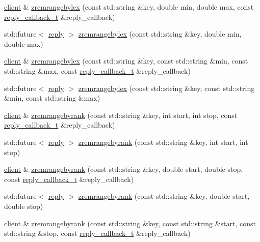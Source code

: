 \begin{DoxyCompactItemize}
\hyperlink{classcpp__redis_1_1client}{client} \& \hyperlink{classcpp__redis_1_1client_ae03899c0520352eb6a800b9d6c12f2ae}{zremrangebylex} (const std\+::string \&key, double min, double max, const \hyperlink{classcpp__redis_1_1client_a061a1140d36d2eaeda82b09a0bb3f9f2}{reply\+\_\+callback\+\_\+t} \&reply\+\_\+callback)
\item 
std\+::future$<$ \hyperlink{classcpp__redis_1_1reply}{reply} $>$ \hyperlink{classcpp__redis_1_1client_a6ed8333a10d5c4390f3e52f91c436264}{zremrangebylex} (const std\+::string \&key, double min, double max)
\item 
\hyperlink{classcpp__redis_1_1client}{client} \& \hyperlink{classcpp__redis_1_1client_a8fe114da4df2dfd2ab5240554444a294}{zremrangebylex} (const std\+::string \&key, const std\+::string \&min, const std\+::string \&max, const \hyperlink{classcpp__redis_1_1client_a061a1140d36d2eaeda82b09a0bb3f9f2}{reply\+\_\+callback\+\_\+t} \&reply\+\_\+callback)
\item 
std\+::future$<$ \hyperlink{classcpp__redis_1_1reply}{reply} $>$ \hyperlink{classcpp__redis_1_1client_a1350d0df45d5b41c940d782682b41bd9}{zremrangebylex} (const std\+::string \&key, const std\+::string \&min, const std\+::string \&max)
\item 
\hyperlink{classcpp__redis_1_1client}{client} \& \hyperlink{classcpp__redis_1_1client_af40c1e6895312c13636db9dd610ce753}{zremrangebyrank} (const std\+::string \&key, int start, int stop, const \hyperlink{classcpp__redis_1_1client_a061a1140d36d2eaeda82b09a0bb3f9f2}{reply\+\_\+callback\+\_\+t} \&reply\+\_\+callback)
\item 
std\+::future$<$ \hyperlink{classcpp__redis_1_1reply}{reply} $>$ \hyperlink{classcpp__redis_1_1client_acc4f3b77c38c948658505ce04bbbde6d}{zremrangebyrank} (const std\+::string \&key, int start, int stop)
\item 
\hyperlink{classcpp__redis_1_1client}{client} \& \hyperlink{classcpp__redis_1_1client_a727a7eeae900fc82525544618deaa70b}{zremrangebyrank} (const std\+::string \&key, double start, double stop, const \hyperlink{classcpp__redis_1_1client_a061a1140d36d2eaeda82b09a0bb3f9f2}{reply\+\_\+callback\+\_\+t} \&reply\+\_\+callback)
\item 
std\+::future$<$ \hyperlink{classcpp__redis_1_1reply}{reply} $>$ \hyperlink{classcpp__redis_1_1client_a7ad8503cfe002efb2caa36a09791125f}{zremrangebyrank} (const std\+::string \&key, double start, double stop)
\item 
\hyperlink{classcpp__redis_1_1client}{client} \& \hyperlink{classcpp__redis_1_1client_aafca4e3ca703fff85b1b6a1c9476c958}{zremrangebyrank} (const std\+::string \&key, const std\+::string \&start, const std\+::string \&stop, const \hyperlink{classcpp__redis_1_1client_a061a1140d36d2eaeda82b09a0bb3f9f2}{reply\+\_\+callback\+\_\+t} \&reply\+\_\+callback)

\end{DoxyCompactItemize}

